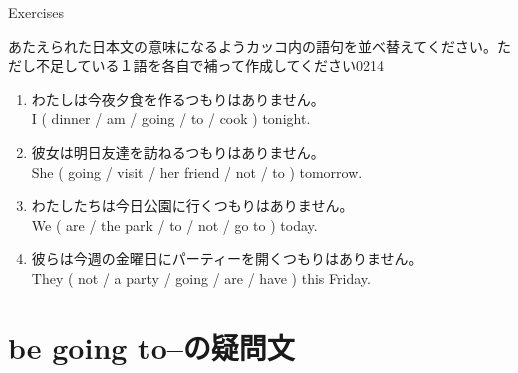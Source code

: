 \documentclass[aspectratio=169,xcolor={dvipsnames,table}]{beamer}
\newcommand{\myaudio}[1]{\href{#1}{\faVolumeUp}}
\begin{document}
\begin{frame}[plain]{Exercises}

 {\small あたえられた日本文の意味になるようカッコ内の語句を並べ替えてください。ただし不足している１語を各自で補って作成してください}\hfill{\tiny 0214}\,{\scriptsize \myaudio{./audio/011_be_going_to_05.mp3}}


\begin{enumerate}
 \item わたしは今夜夕食を作るつもりはありません。\\
I ( dinner / am / going / to / cook ) tonight.\\
\hfill{}
 \item 彼女は明日友達を訪ねるつもりはありません。\\
She ( going / visit / her friend / not / to ) tomorrow.\\
\hfill{}
 \item わたしたちは今日公園に行くつもりはありません。\\
We ( are / the park / to / not / go to ) today.\\
\hfill{}
 \item 彼らは今週の金曜日にパーティーを開くつもりはありません。\\
They ( not / a party / going / are / have ) this Friday.\\
\hfill{}
\end{enumerate}
\end{frame}

\section{be going to--の疑問文}
\end{document}

